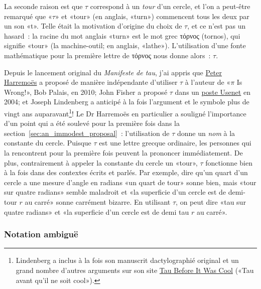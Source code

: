La seconde raison est que $\tau$ correspond à un \emph{tour} d'un cercle, et
l'on a peut-être remarqué que «\ns $\tau$\ns » et «\ns tour\ns » (en anglais,
«\ns turn\ns ») commencent tous les deux par un son «\ns t\ns ». Telle était la
motivation d'origine du choix de $\tau$, et ce n'est pas un hasard~: la racine
du mot anglais «\ns turn\ns » est le mot grec τόρνος (tornos), qui signifie
«\ns tour\ns » (la machine-outil\ns; en anglais, «\ns lathe\ns »). L'utilisation d'une
fonte mathématique pour la première lettre de τόρνος nous donne alors~: $\tau$.

Depuis le lancement original du \emph{Manifeste de tau}, j'ai appris que
\href{http://www.harremoes.dk/Peter/Undervis/Turnpage/Turnpage1.pdf}{Peter
Harremoës} a proposé de manière indépendante d'utiliser $\tau$ à l'auteur de
«\ns $\pi$ Is Wrong!\ns », Bob Palais, en 2010\ns; John Fisher a proposé $\tau$ dans
un
\href{https://groups.google.com/forum/#!msg/sci.math/c-DHmJHSA0A/sLCoOtHB1UAJ}{poste
Usenet} en 2004\ns; et Joseph Lindenberg a anticipé à la fois l'argument et le
symbole plus de vingt ans auparavant\ns\footnote{Lindenberg a inclus à la fois
son manuscrit dactylographié original et un grand nombre d'autres arguments sur
son site \href{https://sites.google.com/site/taubeforeitwascool/}{Tau Before It
Was Cool} («\ns Tau avant qu'il ne soit cool\ns »).}\ns! Le Dr Harremoës en
particulier a souligné l'importance d'un point qui a été soulevé pour la
première fois dans la section~\ref{sec:an_immodest_proposal}~: l'utilisation de
$\tau$ donne un \emph{nom} à la constante du cercle. Puisque $\tau$ est une
lettre grecque ordinaire, les personnes qui la rencontrent pour la première fois
peuvent la prononcer immédiatement. De plus, contrairement à appeler la
constante du cercle un «\ns tour\ns », $\tau$ fonctionne bien à la fois dans des
contextes écrits et parlés. Par exemple, dire qu'un quart d'un cercle a une
mesure d'angle en radians «\ns un quart de tour\ns » sonne bien, mais «\ns tour sur quatre
radians\ns » semble maladroit et «\ns la superficie d'un cercle est de demi-tour $r$
au carré\ns » sonne carrément bizarre. En utilisant $\tau$, on peut dire «\ns tau
sur quatre radians\ns » et «\ns la superficie d'un cercle est de demi tau $r$ au
carré\ns ».

    \subsubsection{Notation ambiguë} %
    \label{sec:ambiguous_notation}


